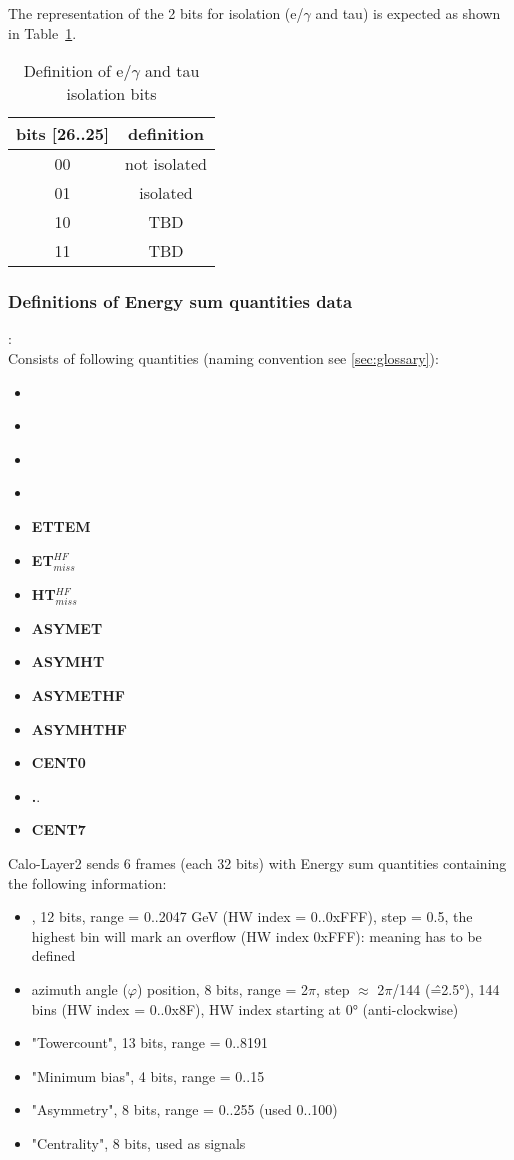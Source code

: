 The representation of the 2 bits for isolation (e/$\gamma$ and tau) is expected as shown in Table~\ref{tab:gtl:eg_tau_iso_bits}.\\

\begin{table}[ht]
\caption{Definition of e/$\gamma$ and tau isolation bits}
\vspace{5mm}
\centering
\begin{tabular}{|c|c|}\hline
bits [26..25] & definition \\\hline\hline
00 & not isolated \\
01 & isolated \\
10 & TBD \\
11 & TBD \\\hline
\end{tabular}
\label{tab:gtl:eg_tau_iso_bits}
\end{table}

\subsubsection{Definitions of Energy sum quantities data}

\textbf{\esums}:\\ Consists of following quantities (naming convention see \ref{sec:glossary}):
\begin{itemize}
\item \textbf{\ett}
\item \textbf{\htt}
\item \textbf{\etm}
\item \textbf{\htm}
\item \textbf{ETTEM}
\item \textbf{ET$_{miss}^{HF}$}
\item \textbf{HT$_{miss}^{HF}$}
\item \textbf{ASYMET}
\item \textbf{ASYMHT}
\item \textbf{ASYMETHF}
\item \textbf{ASYMHTHF}
\item \textbf{CENT0}
\item \textbf..
\item \textbf{CENT7}
\end{itemize}

Calo-Layer2 sends 6 frames (each 32 bits) with Energy sum quantities containing the following information:
\begin{itemize}
\item \et, 12 bits, range = 0..2047 GeV (HW index = 0..0xFFF), step = 0.5, the highest bin will mark an overflow (HW index 0xFFF): meaning has to be defined
\item azimuth angle ($\varphi$) position, 8 bits, range = 2$\pi$, step $\approx$ 2$\pi$/144 (\^=2.5°), 144 bins (HW index = 0..0x8F), HW index starting at 0° (anti-clockwise)
\item "Towercount", 13 bits, range = 0..8191
\item "Minimum bias", 4 bits, range = 0..15
\item "Asymmetry", 8 bits, range = 0..255 (used 0..100)
\item "Centrality", 8 bits, used as signals
\end{itemize}


